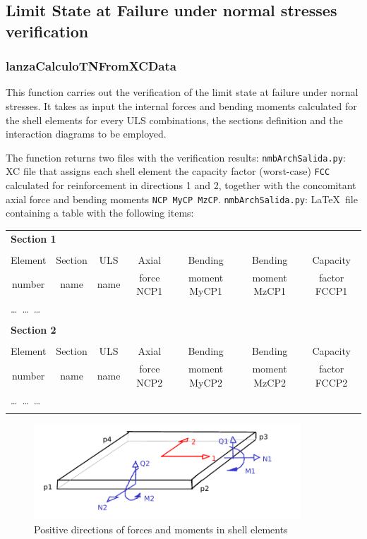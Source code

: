 \subsection{Limit State at Failure under normal stresses verification}

\subsubsection{lanzaCalculoTNFromXCData}
This function carries out the verification of the limit state at failure under nornal stresses. It takes as input the internal forces and bending moments calculated for the shell elements for every ULS combinations, the sections definition and the interaction diagrams to be employed.

The function returns two files with the verification results:
{\tt nmbArchSalida.py}: XC file that assigns each shell element the capacity factor (worst-case) {\tt FCC} calculated for reinforcement in directions 1 and 2, together with the concomitant axial force and bending moments {\tt NCP MyCP MzCP}.
{\tt nmbArchSalida.py}: \LaTeX\  file containing a table with the following items:

\begin{center}
\begin{tabular}{ccccccc}
\multicolumn{7}{l}{\textbf{Section 1}} \\
\\
Element & Section & ULS & Axial & Bending & Bending & Capacity \\
number  & name & name & force NCP1 & moment MyCP1 & moment MzCP1 & factor FCCP1 \\
\hline
\multicolumn{7}{l}{\ldots\ \ldots\ \ldots} \\
\\
\multicolumn{7}{l}{\textbf{Section 2}} \\
\\
Element & Section & ULS & Axial & Bending & Bending & Capacity \\
number  & name & name & force NCP2 & moment MyCP2 & moment MzCP2 & factor FCCP2 \\
\hline
\multicolumn{7}{l}{\ldots\ \ldots\ \ldots} \\
\\

\end{tabular}
\end{center}

\begin{figure}[h]
\centering
\includegraphics[width=100mm]{materials/figures/signosEsfuerzos}
\caption{Positive directions of forces and moments in shell elements}\label{shell_forces_moments}
\end{figure}

